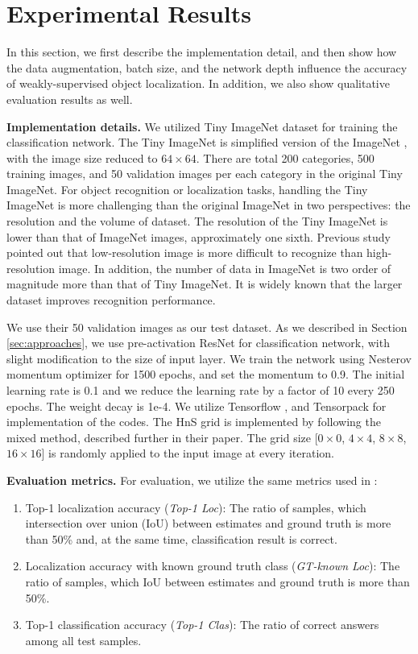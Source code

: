 \documentclass{bmvc2k}
\begin{document}
\section{Experimental Results}
\label{sec:experiments}

In this section, we first describe the implementation detail, and then show how the data augmentation, batch size, and the network depth influence the accuracy of weakly-supervised object localization. In addition, we also show qualitative evaluation results as well. 

\textbf{Implementation details.} We utilized Tiny ImageNet dataset for training the classification network. The Tiny ImageNet is simplified version of the ImageNet \cite{russakovsky2015imagenet}, with the image size reduced to $64\times64$. There are total 200 categories, 500 training images, and 50 validation images per each category in the original Tiny ImageNet. For object recognition or localization tasks, handling the Tiny ImageNet is more challenging than the original ImageNet in two perspectives: the resolution and the volume of dataset. The resolution of the Tiny ImageNet is lower than that of ImageNet images, approximately one sixth. Previous study \cite{odena2016conditional} pointed out that low-resolution image is more difficult to recognize than high-resolution image. In addition, the number of data in ImageNet is two order of magnitude more than that of Tiny ImageNet. It is widely known that the larger dataset improves recognition performance. 

We use their 50 validation images as our test dataset. As we described in Section \ref{sec:approaches}, we use pre-activation ResNet for classification network, with slight modification to the size of input layer. We train the network using Nesterov momentum optimizer \cite{bengio2013advances} for 1500 epochs, and set the momentum to 0.9. The initial learning rate is 0.1 and we reduce the learning rate by a factor of 10 every 250 epochs. The weight decay is 1e-4. We utilize Tensorflow \cite{abadi2016tensorflow}, and Tensorpack \cite{wu2016tensorpack} for implementation of the codes. The HnS grid is implemented by following the mixed method, described further in their paper. The grid size [$0\times0$, $4\times4$, $8\times8$, $16\times16$] is randomly applied to the input image at every iteration.



\textbf{Evaluation metrics.} For evaluation, we utilize the same metrics used in \cite{singh2017hide}:
\begin{enumerate}
  \item Top-1 localization accuracy (\textit{Top-1 Loc}): The ratio of samples, which intersection over union (IoU) between estimates and ground truth is more than 50\% and, at the same time, classification result is correct.
  \item Localization accuracy with known ground truth class (\textit{GT-known Loc}): The ratio of samples, which IoU between estimates and ground truth is more than 50\%.
  \item Top-1 classification accuracy (\textit{Top-1 Clas}): The ratio of correct answers among all test samples. 
\end{enumerate}
\end{document}
